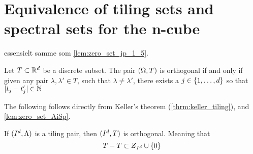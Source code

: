 \documentclass[../thesis.tex]{subfiles}
\begin{document}
\section{Equivalence of tiling sets and spectral sets for the n-cube}

essensielt samme som \cref{lem:zero_set_jp_1_5}. %


\begin{lemma}\label{lem:zero_set_AiSp}
    Let $T\subset \mathbb{R}^d$ be a discrete subset. The pair $(\Omega,T)$ is orthogonal if and only if given any pair $\lambda, \lambda' \in T$, such that $\lambda\neq\lambda'$, there exists a $j\in \{1,\dots,d\}$ so that $|t_j -t_j' | \in \mathbb{N}$
\end{lemma}


The following  follows directly from Keller's theorem (\cref{thrm:keller_tiling}), and \cref{lem:zero_set_AiSp}.
\begin{corollary}\label{cor:tiling_pair_implies_orthogonal}
    If $(I^d, \Lambda)$ is a tiling pair, then $(I^d,T)$ is orthogonal. Meaning that 
    \begin{equation*}
        T-T \subset \Zstroke_{I^d}\cup \braq{0}
    \end{equation*}
\end{corollary}
\end{document}
